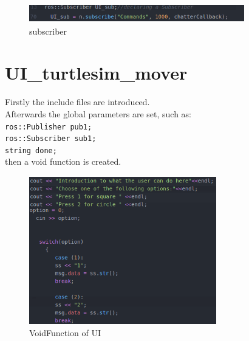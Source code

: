 \begin{figure}[h]
\begin{center}
\includegraphics[width=.9\textwidth]{figures/subscriber.png}
\caption{subscriber}
\end{center}
\end{figure}\label{fig:subscriber}

\section{UI\_turtlesim\_mover}

Firstly the include files are introduced.\\
Afterwards the global parameters are set, such as:\\
\texttt{ros::Publisher pub1;}\\
\texttt{ros::Subscriber sub1;}\\
\texttt{string done;}\\
then a void function is created.\\

\begin{figure}[h]
\begin{center}
\includegraphics[width=.5\textwidth]{figures/switch.png}
\caption{VoidFunction of UI}
\end{center}
\end{figure}\label{fig:switch}

